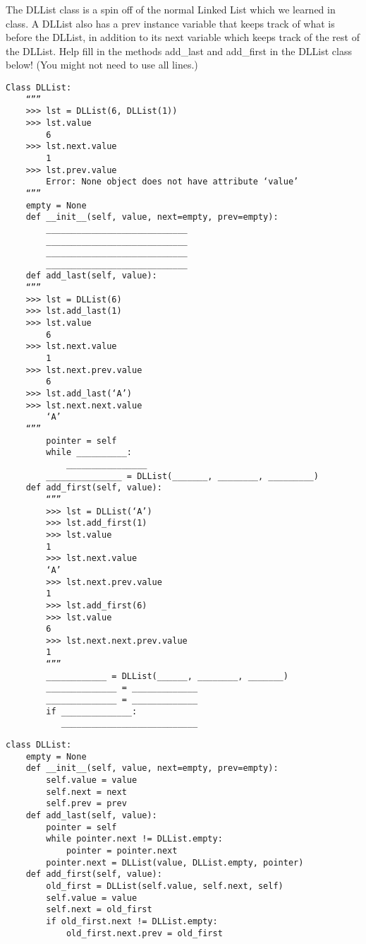 \begin{blocksection}
\question The DLList class is a spin off of the normal Linked List which we learned in class. A DLList also has a prev instance variable that keeps track of what is before the DLList, in addition to its next variable which keeps track of the rest of the DLList. Help fill in the methods add_last and add_first in the DLList class below! (You might not need to use all lines.)

\begin{lstlisting}
Class DLList:
	“””
	>>> lst = DLList(6, DLList(1))
	>>> lst.value
	    6
	>>> lst.next.value
	    1
	>>> lst.prev.value
	    Error: None object does not have attribute ‘value’
	“””
	empty = None
	def __init__(self, value, next=empty, prev=empty):
		____________________________
		____________________________
		____________________________
		____________________________
	def add_last(self, value):
	“””
	>>> lst = DLList(6)
	>>> lst.add_last(1)
	>>> lst.value
	    6
	>>> lst.next.value
	    1
	>>> lst.next.prev.value
	    6
	>>> lst.add_last(‘A’)
	>>> lst.next.next.value
	    ‘A’
	“””
		pointer = self
		while __________:
			________________
		_______________ = DLList(_______, ________, _________)
	def add_first(self, value):
		“””
		>>> lst = DLList(‘A’)
		>>> lst.add_first(1)
		>>> lst.value
		1
		>>> lst.next.value
		‘A’
		>>> lst.next.prev.value
		1
		>>> lst.add_first(6)
		>>> lst.value
		6
		>>> lst.next.next.prev.value
		1
		“””
		____________ = DLList(______, ________, _______)
		______________ = _____________
		______________ = _____________
		if ______________:
		   ___________________________
\end{lstlisting}

\begin{solution}[0.7in]
\begin{lstlisting}
class DLList:
	empty = None
	def __init__(self, value, next=empty, prev=empty):
    	self.value = value
    	self.next = next
    	self.prev = prev
  	def add_last(self, value):
    	pointer = self
    	while pointer.next != DLList.empty:
      		pointer = pointer.next
   		pointer.next = DLList(value, DLList.empty, pointer)
  	def add_first(self, value):
    	old_first = DLList(self.value, self.next, self)
    	self.value = value
    	self.next = old_first
    	if old_first.next != DLList.empty:
      		old_first.next.prev = old_first
\end{lstlisting}
\end{solution}
\end{blocksection}

